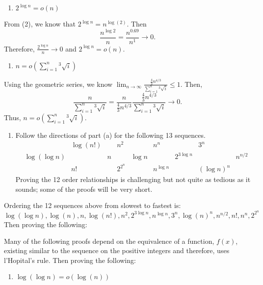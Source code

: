 \documentclass[12pt,]{article}
\providecommand{\tightlist}{%
  \setlength{\itemsep}{0pt}\setlength{\parskip}{0pt}}
\begin{document}
\begin{enumerate}
\def\labelenumi{(\arabic{enumi})}
\setcounter{enumi}{2}
\tightlist
\item
  \(2^{\log n} = o(n)\)
\end{enumerate}

From (2), we know that \(2^{\log n} = n^{\log(2)}.\) Then
\[\frac{n^{\log 2}}{n}=\frac{n^{0.69}}{n^1}\rightarrow 0.\] Therefore,
\(\frac{2^{\log n}}{n}\rightarrow 0\) and \(2^{\log n} = o(n)\).

\begin{enumerate}
\def\labelenumi{(\arabic{enumi})}
\setcounter{enumi}{3}
\tightlist
\item
  \(n = o\left(\sum_{i = 1}^n {^3\sqrt{i}}\right)\)
\end{enumerate}

Using the geometric series, we know
\(\lim_{n\rightarrow \infty}\frac{\frac{4}{3}n^{4/3}}{\sum_{i = 1}^n {^3\sqrt{i}}} \le 1\).
Then,
\[\frac{n}{\sum_{i = 1}^n {^3\sqrt{i}}}=\frac{n}{\frac{4}{3} n^{4/3}}\frac{\frac{4}{3}n^{4/3}}{\sum_{i = 1}^n {^3\sqrt{i}}}\rightarrow 0.\]
Thus, \(n = o\left(\sum_{i = 1}^n {^3\sqrt{i}}\right)\).

\begin{enumerate}
\def\labelenumi{\alph{enumi}.}
\setcounter{enumi}{1}
\tightlist
\item
  Follow the directions of part (a) for the following 13 sequences.
  \begin{align*}
  && \log (n!) && n^2 && n^n && 3^n \\
  &\log(\log n) && n && \log n && 2^{3\log n} && n^{n/2} \\
  && n! && 2^{2^n} && n^{\log n} && (\log n)^n
  \end{align*} Proving the 12 order relationships is challenging but not
  quite as tedious as it sounds; some of the proofs will be very short.
\end{enumerate}

Ordering the 12 sequences above from slowest to fastest is:
\[\log(\log n), \log(n), n, \log(n!), n^2, 2^{3\log n}, n^{\log n}, 3^n, \log(n)^n, n^{n/2}, n!, n^n, 2^{2^n}\]
Then proving the following:

Many of the following proofs depend on the equivalence of a function,
\(f(x)\), existing similar to the sequence on the positive integers and
therefore, uses l'Hopital's rule. Then proving the following:

\begin{enumerate}
\def\labelenumi{(\arabic{enumi})}
\tightlist
\item
  \(\log(\log n) = o\left(\log(n)\right)\)
\end{enumerate}
\end{document}
